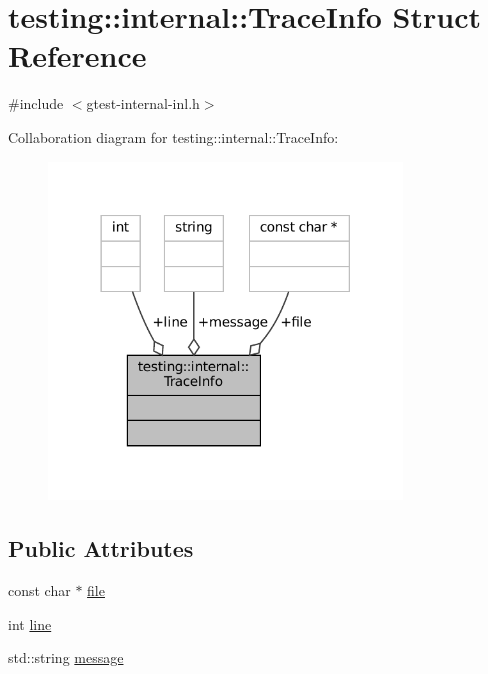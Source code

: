 \hypertarget{structtesting_1_1internal_1_1TraceInfo}{}\section{testing\+:\+:internal\+:\+:Trace\+Info Struct Reference}
\label{structtesting_1_1internal_1_1TraceInfo}


{\ttfamily \#include $<$gtest-\/internal-\/inl.\+h$>$}



Collaboration diagram for testing\+:\+:internal\+:\+:Trace\+Info\+:
\nopagebreak
\begin{figure}[H]
\begin{center}
\leavevmode
\includegraphics[width=266pt]{structtesting_1_1internal_1_1TraceInfo__coll__graph}
\end{center}
\end{figure}
\subsection*{Public Attributes}
\begin{DoxyCompactItemize}
\item 
const char $\ast$ \hyperlink{structtesting_1_1internal_1_1TraceInfo_a5d801209d3c0840aa55cfd4b67504254}{file}
\item 
int \hyperlink{structtesting_1_1internal_1_1TraceInfo_ae9d269de1b77f4a3180d0d34acb4d7ff}{line}
\item 
std\+::string \hyperlink{structtesting_1_1internal_1_1TraceInfo_a39e74f39ce6d5fdbac799abdb1c27f90}{message}
\end{DoxyCompactItemize}


